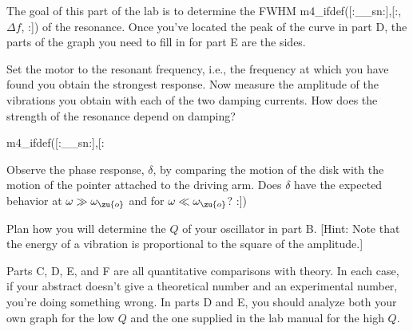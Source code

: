 
The goal of this part of the lab is to determine 
the FWHM m4_ifdef([:__sn:],[:, $\Delta f$, :])  of the resonance.
Once you've located the peak of the curve in part D, the parts of the
graph you need to fill in for part E are the sides.


Set the motor to the resonant frequency, i.e., the frequency
at which you have found you obtain the strongest response.
Now measure the amplitude of the vibrations you obtain with
each of the two damping currents. How does the strength of
the resonance depend on damping?

m4_ifdef([:__sn:],[:%

Observe the phase response, $\delta$, by comparing the
motion of the disk with the motion of the pointer attached to
the driving arm. Does $\delta$ have the expected behavior
at $\omega \gg \omega_\zu{o}$ and for $\omega \ll \omega_\zu{o}$?
:])

\prelab

\prelabquestion  Plan how you will determine the $Q$ of your oscillator
in part B. [Hint: Note that the energy of a vibration is
proportional to the square of the amplitude.]

\analysis

Parts C, D, E, and F are all quantitative comparisons with theory.
In each case, if your abstract doesn't give a theoretical number and
an experimental number, you're doing something wrong.
In parts D and E, you should analyze both your own graph for the low $Q$ and
the one supplied in the lab manual for the high $Q$.
